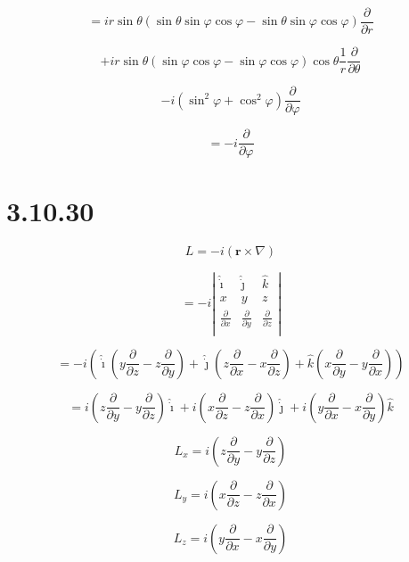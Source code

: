 \documentclass[12pt]{article}
\begin{document}
\[
    = i r \sin{\theta}
    \left(\sin{\theta} \sin{\varphi} \cos{\varphi} - \sin{\theta} \sin{\varphi} \cos{\varphi} \right)
    \frac{\partial}{\partial r}
\]

\[
    + i r \sin{\theta}
    \left(\sin{\varphi} \cos{\varphi} - \sin{\varphi} \cos{\varphi}\right)
    \cos{\theta} \frac{1}{r} \frac{\partial}{\partial \theta}
\]

\[
    - i \left(\sin^2{\varphi} + \cos^2{\varphi} \right) \frac{\partial}{\partial \varphi}
\]

\[
    = - i \frac{\partial}{\partial \varphi}
\]

\section{3.10.30}

\[
    L = -i \left(\textbf{r} \times \nabla\right)
\]

\[
    = -i \left\lvert \begin{array}{ccc}
        \hat{\dot{\imath}}          & \hat{\dot{\jmath}}          & \hat{k}                     \\
        x                           & y                           & z                           \\
        \frac{\partial}{\partial x} & \frac{\partial}{\partial y} & \frac{\partial}{\partial z} \\
    \end{array} \right\rvert
\]

\[
    =
    -i
    \left(
    \hat{\dot{\imath}} \left(y \frac{\partial}{\partial z} - z \frac{\partial}{\partial y}\right)
    + \hat{\dot{\jmath}} \left(z \frac{\partial}{\partial x} - x \frac{\partial}{\partial z}\right)
    + \hat{k} \left(x \frac{\partial}{\partial y} - y \frac{\partial}{\partial x}\right)
    \right)
\]

\[
    = i \left(z \frac{\partial}{\partial y} - y \frac{\partial}{\partial z}\right) \hat{\dot{\imath}}
    + i \left(x \frac{\partial}{\partial z} - z \frac{\partial}{\partial x}\right) \hat{\dot{\jmath}}
    + i \left(y \frac{\partial}{\partial x} - x \frac{\partial}{\partial y}\right) \hat{k}
\]

\[
    L_x = i \left(z \frac{\partial}{\partial y} - y \frac{\partial}{\partial z}\right)
\]

\[
    L_y = i \left(x \frac{\partial}{\partial z} - z \frac{\partial}{\partial x}\right)
\]

\[
    L_z = i \left(y \frac{\partial}{\partial x} - x \frac{\partial}{\partial y}\right)
\]
\end{document}
